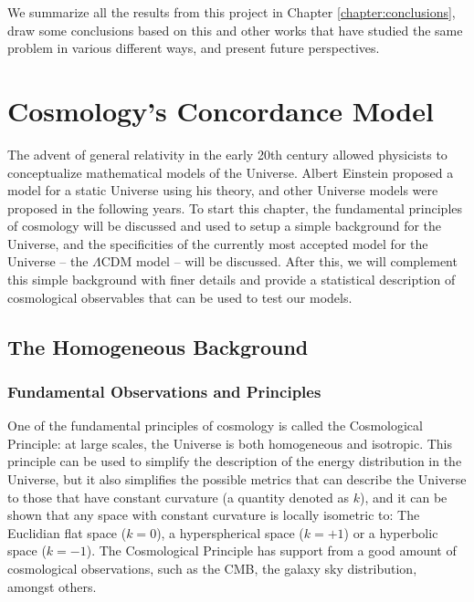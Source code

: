 \documentclass[openany,a4paper,12pt,oneside]{book}
\begin{document}
\begin{spacing}{1.5}
We summarize all the results from this project in Chapter \ref{chapter:conclusions}, draw some conclusions based on this and other works that have studied the same problem in various different ways, and present future perspectives.

\chapter{Cosmology's Concordance Model}\label{chapter:model}

The advent of general relativity in the early 20th century allowed physicists to conceptualize mathematical models of the Universe. Albert Einstein proposed a model for a static Universe using his theory\cite{Einstein:1917ce}, and other Universe models were proposed in the following years. To start this chapter, the fundamental principles of cosmology will be discussed and used to setup a simple background for the Universe, and the specificities of the currently most accepted model for the Universe -- the $\Lambda$CDM model -- will be discussed. After this, we will complement this simple background with finer details and provide a statistical description of cosmological observables that can be used to test our models.

\section{The Homogeneous Background}

\subsection{Fundamental Observations and Principles}

One of the fundamental principles of cosmology is called the Cosmological Principle: at large scales, the Universe is both homogeneous and isotropic. This principle can be used to simplify the description of the energy distribution in the Universe, but it also simplifies the possible metrics that can describe the Universe to those that have constant curvature (a quantity denoted as $k$), and it can be shown that any space with constant curvature is locally isometric to: The Euclidian flat space ($k=0$), a hyperspherical space ($k=+1$) or a hyperbolic space ($k=-1$)\cite{choquet2008general}. The Cosmological Principle has support from a good amount of cosmological observations, such as the CMB\cite{COBE}, the galaxy sky distribution\cite{galaxy_isotropy, galaxy_homogeneity_Pandey_2021}, amongst others. 


\end{spacing}
\end{document}
